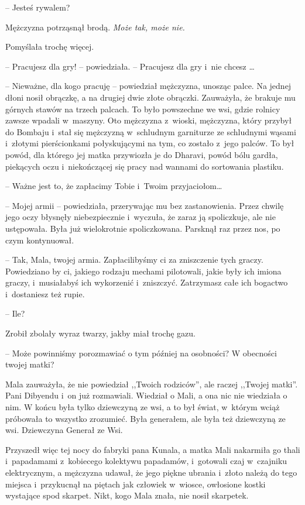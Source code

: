 \documentclass[oneside,polish,11pt,rmheadings]{mwbk}
\begin{document}
-- Jesteś rywalem? 


Mężczyzna potrząsnął brodą. \textit{Może tak, może nie.}  


Pomyślała trochę więcej. 

-- Pracujesz dla gry! -- powiedziała. -- Pracujesz dla gry i~nie chcesz \ldots  


-- Nieważne, dla kogo pracuję -- powiedział mężczyzna, unosząc palce. Na jednej dłoni nosił obrączkę, a na drugiej dwie złote obrączki. Zauważyła, że \hspace{0pt}brakuje mu górnych stawów na trzech palcach. To było powszechne we wsi, gdzie rolnicy zawsze wpadali w~maszyny. Oto mężczyzna z~wioski, mężczyzna, który przybył do Bombaju i~stał się mężczyzną w~schludnym garniturze ze schludnymi wąsami i~złotymi pierścionkami połyskującymi na tym, co zostało z~jego palców. To był powód, dla którego jej matka przywiozła je do Dharavi, powód bólu gardła, piekących oczu i~niekończącej się pracy nad wannami do sortowania plastiku. 


-- Ważne jest to, że zapłacimy Tobie i~Twoim przyjaciołom\ldots  


-- Mojej armii -- powiedziała, przerywając mu bez zastanowienia. Przez chwilę jego oczy błysnęły niebezpiecznie i~wyczuła, że zaraz ją spoliczkuje, ale nie ustępowała. Była już wielokrotnie spoliczkowana. Parsknął raz przez nos, po czym kontynuował. 


-- Tak, Mala, twojej armia. Zapłacilibyśmy ci za zniszczenie tych graczy. Powiedziano by ci, jakiego rodzaju mechami pilotowali, jakie były ich imiona graczy, i~musiałabyś ich wykorzenić i~zniszczyć. Zatrzymasz całe ich bogactwo i~dostaniesz też rupie. 


-- Ile?  


Zrobił zbolały wyraz twarzy, jakby miał trochę gazu. 

-- Może powinniśmy porozmawiać o tym później na osobności? W obecności twojej matki? 


Mala zauważyła, że nie powiedział ,,Twoich rodziców'', ale raczej ,,Twojej matki''. Pani Dibyendu i~on już rozmawiali. Wiedział o Mali, a ona nic nie wiedziała o nim. W końcu była tylko dziewczyną ze wsi, a to był świat, w~którym wciąż próbowała to wszystko zrozumieć. Była generałem, ale była też dziewczyną ze wsi. Dziewczyna Generał ze Wsi. 


Przyszedł więc tej nocy do fabryki pana Kunala, a matka Mali nakarmiła go thali i~papadamami z~kobiecego kolektywu papadamów, i~gotowali czaj w~czajniku elektrycznym, a mężczyzna udawał, że jego piękne ubrania i~złoto należą do tego miejsca i~przykucnął na piętach jak człowiek w~wiosce, owłosione kostki wystające spod skarpet. Nikt, kogo Mala znała, nie nosił skarpetek. 
\end{document}
